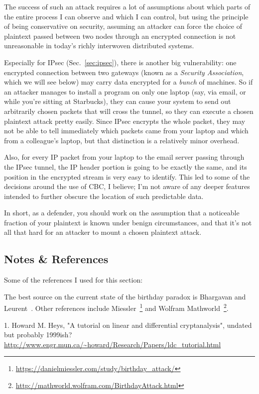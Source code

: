 \documentclass[%
 aip,
 jmp,%
 amsmath,amssymb,
 reprint,%
]{revtex4-1}
\begin{document}
The success of such an attack requires a lot of assumptions about
which parts of the entire process I can observe and which I can
control, but using the principle of being conservative on security,
assuming an attacker can force the choice of plaintext passed between
two nodes through an encrypted connection is not unreasonable in
today's richly interwoven distributed systems.

Especially for IPsec (Sec.~\ref{sec:ipsec}), there is another big
vulnerability: one encrypted connection between two gateways (known as
a \emph{Security Association}, which we will see below) may carry data
encrypted for a \emph{bunch} of machines.  So if an attacker manages
to install a program on only one laptop (say, via email, or while
you're sitting at Starbucks), they can cause your system to send out
arbitrarily chosen packets that will cross the tunnel, so they can
execute a chosen plaintext attack pretty easily.  Since IPsec encrypts
the whole packet, they may not be able to tell immediately which
packets came from your laptop and which from a colleague's laptop, but
that distinction is a relatively minor overhead.

Also, for every IP packet from your laptop to the email server passing
through the IPsec tunnel, the IP header portion is going to be exactly
the same, and its position in the encrypted stream is very easy to
identify.  This led to some of the decisions around the use of CBC, I
believe; I'm not aware of any deeper features intended to further
obscure the location of such predictable data.

In short, as a defender, you should work on the assumption that a
noticeable fraction of your plaintext is known under benign
circumstances, and that it's not all that hard for an attacker to
mount a chosen plaintext attack.

\subsection{Notes \& References}

Some of the references I used for this section:

The best source on the current state of the birthday paradox is Bhargavan and Leurent~\cite{bhargavan2016practical}.  Other references include Miessler~\footnote{\url{https://danielmiessler.com/study/birthday_attack/}} and Wolfram Mathworld~\footnote{\url{http://mathworld.wolfram.com/BirthdayAttack.html}}.

1. Howard M. Heys, "A tutorial on linear and differential
cryptanalysis", undated but probably 1999ish?
\url{http://www.engr.mun.ca/~howard/Research/Papers/ldc_tutorial.html}
\end{document}
